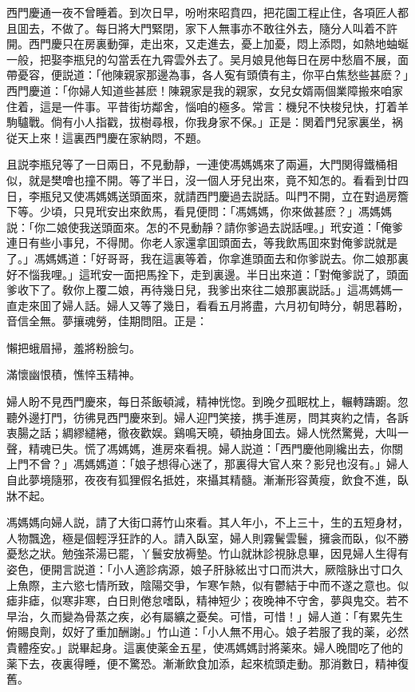 西門慶通一夜不曾睡着。到次日早，吩咐來昭賁四，把花園工程止住，各項匠人都且囬去，不做了。每日將大門緊閉，家下人無事亦不敢往外去，隨分人叫着不許開。西門慶只在房裏動彈，走出來，又走進去，憂上加憂，悶上添悶，如熱地蚰蜒一般，把娶李瓶兒的勾當丢在九霄雲外去了。吴月娘見他每日在房中愁眉不展，面帶憂容，便説道：「他陳親家那邊為事，各人寃有頭債有主，你平白焦愁些甚麽？」西門慶道：「你婦人知道些甚麽！陳親家是我的親家，女兒女婿兩個業障搬來咱家住着，這是一件事。平昔街坊鄰舍，惱咱的極多。常言：機兒不快梭兒快，打着羊駒驢戰。倘有小人指戳，拔樹尋根，你我身家不保。」正是：関着門兒家裏坐，祸従天上來！這裏西門慶在家納悶，不題。

且説李瓶兒等了一日兩日，不見動靜，一連使馮媽媽來了兩遍，大門関得鐵桶相似，就是樊噲也撞不開。等了半日，沒一個人牙兒出來，竟不知怎的。看看到廿四日，李瓶兒又使馮媽媽送頭面來，就請西門慶過去説話。叫門不開，立在對過房簷下等。少頃，只見玳安出來飲馬，看見便問：「馮媽媽，你來做甚麽？」馮媽媽説：「你二娘使我送頭面來。怎的不見動靜？請你爹過去説話哩。」玳安道：「俺爹連日有些小事兒，不得閒。你老人家還拿囬頭面去，等我飲馬囬來對俺爹説就是了。」馮媽媽道：「好哥哥，我在這裏等着，你拿進頭面去和你爹説去。你二娘那裏好不惱我哩。」這玳安一面把馬拴下，走到裏邊。半日出來道：「對俺爹説了，頭面爹收下了。敎你上覆二娘，再待幾日兒，我爹出來往二娘那裏説話。」這馮媽媽一直走來囬了婦人話。婦人又等了幾日，看看五月將盡，六月初旬時分，朝思暮盼，音信全無。夢攘魂勞，佳期問阻。正是：

\begin{myquote}
懶把蛾眉掃，羞將粉臉匀。

滿懷幽恨積，憔悴玉精神。
\end{myquote}

婦人盼不見西門慶來，每日茶飯頓減，精神恍惚。到晚夕孤眠枕上，輾轉躊躕。忽聽外邊打門，彷彿見西門慶來到。婦人迎門笑接，携手進房，問其爽約之情，各訴衷腸之話；綢繆繾綣，徹夜歡娱。鷄鳴天曉，頓抽身囬去。婦人恍然驚覺，大叫一聲，精魂已失。慌了馮媽媽，進房來看視。婦人説道：「西門慶他剛纔出去，你關上門不曾？」馮媽媽道：「娘子想得心迷了，那裏得大官人來？影兒也沒有。」婦人自此夢境隨邪，夜夜有狐狸假名抵姓，來攝其精髓。漸漸形容黄瘦，飲食不進，臥牀不起。

馮媽媽向婦人説，請了大街口蔣竹山來看。其人年小，不上三十，生的五短身材，人物飄逸，極是個輕浮狂詐的人。請入臥室，婦人則霧鬢雲鬟，擁衾而臥，似不勝憂愁之狀。勉強茶湯已罷，丫鬟安放褥墊。竹山就牀診視脉息畢，因見婦人生得有姿色，便開言説道：「小人適診病源，娘子肝脉絃出寸口而洪大，厥陰脉出寸口久上魚際，主六慾七情所致，陰陽交爭，乍寒乍熱，似有鬱結于中而不遂之意也。似瘧非瘧，似寒非寒，白日則倦怠嗜臥，精神短少；夜晚神不守舍，夢與鬼交。若不早治，久而變為骨蒸之疾，必有屬纊之憂矣。可惜，可惜！」婦人道：「有累先生俯賜良劑，奴好了重加酬謝。」竹山道：「小人無不用心。娘子若服了我的薬，必然貴體痊安。」説畢起身。這裏使薬金五星，使馮媽媽討將薬來。婦人晚間吃了他的薬下去，夜裏得睡，便不驚恐。漸漸飲食加添，起來梳頭走動。那消數日，精神復舊。

